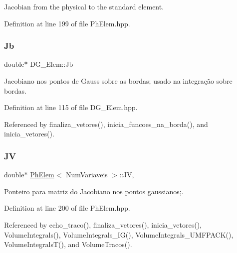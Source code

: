 Jacobian from the physical to the standard element. 



Definition at line 199 of file Ph\+Elem.\+hpp.

\mbox{\label{classDG__Elem_a21966ef258f170053e616e17082516c8}} 
\subsubsection{\texorpdfstring{Jb}{Jb}}
{\footnotesize\ttfamily double$\ast$ D\+G\+\_\+\+Elem\+::\+Jb\hspace{0.3cm}{\ttfamily [private]}}



Jacobiano nos pontos de Gauss sobre as bordas; usado na integração sobre bordas. 



Definition at line 115 of file D\+G\+\_\+\+Elem.\+hpp.



Referenced by finaliza\+\_\+vetores(), inicia\+\_\+funcoes\+\_\+na\+\_\+borda(), and inicia\+\_\+vetores().

\mbox{\label{classPhElem_a569278e8b30ca90d0e6f920b5bba7dd5}} 
\subsubsection{\texorpdfstring{JV}{JV}}
{\footnotesize\ttfamily double$\ast$ \hyperlink{classPhElem}{Ph\+Elem}$<$ Num\+Variaveis $>$\+::JV\hspace{0.3cm}{\ttfamily [protected]}, {\ttfamily [inherited]}}



Ponteiro para matriz do Jacobiano nos pontos gaussianos;. 



Definition at line 200 of file Ph\+Elem.\+hpp.



Referenced by echo\+\_\+traco(), finaliza\+\_\+vetores(), inicia\+\_\+vetores(), Volume\+Integrals(), Volume\+Integrals\+\_\+\+I\+G(), Volume\+Integrals\+\_\+\+U\+M\+F\+P\+A\+C\+K(), Volume\+Integrals\+T(), and Volume\+Tracos().

\mbox{\label{classDG__Elem_a32939229d5c3e35ef503c432975949cc}} 
